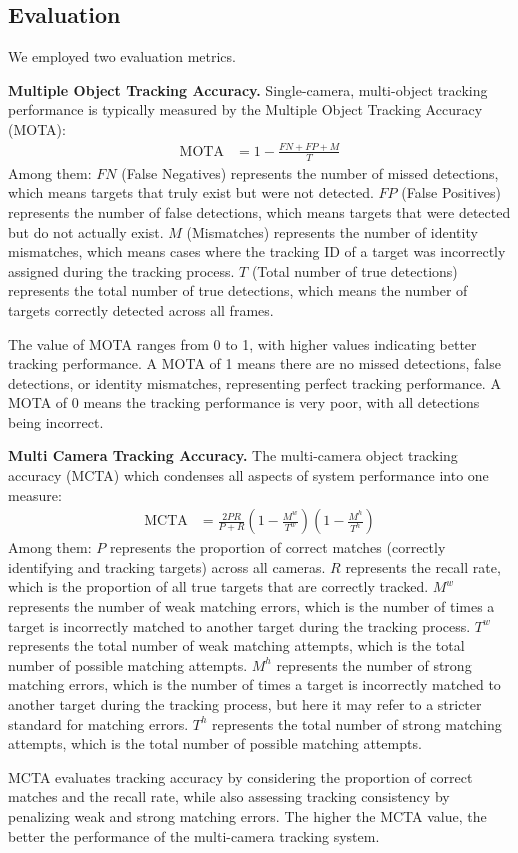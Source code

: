 \subsection{Evaluation}

We employed two evaluation metrics.

\textbf{Multiple Object Tracking Accuracy.}
Single-camera, multi-object tracking performance is typically measured by the Multiple Object Tracking Accuracy (MOTA):
\begin{align}
	\mathrm{MOTA} & = 1-\frac{F N+F P+M}{T}
\end{align}
Among them:
$FN$ (False Negatives) represents the number of missed detections, which means targets that truly exist but were not detected.
$FP$ (False Positives) represents the number of false detections, which means targets that were detected but do not actually exist.
$M$ (Mismatches) represents the number of identity mismatches, which means cases where the tracking ID of a target was incorrectly assigned during the tracking process.
$T$ (Total number of true detections) represents the total number of true detections, which means the number of targets correctly detected across all frames.

The value of MOTA ranges from 0 to 1, with higher values indicating better tracking performance. 
A MOTA of 1 means there are no missed detections, false detections, or identity mismatches, representing perfect tracking performance. 
A MOTA of 0 means the tracking performance is very poor, with all detections being incorrect.

\textbf{Multi Camera Tracking Accuracy.}
The multi-camera object tracking accuracy (MCTA) which condenses all aspects of system performance into one measure\cite{Alpher23b}:
\begin{align}
	\mathrm{MCTA} & = \frac{2 P R}{P+R}\left(1-\frac{M^{w}}{T^{w}}\right)\left(1-\frac{M^{h}}{T^{h}}\right)
\end{align}
Among them:
$P$ represents the proportion of correct matches (correctly identifying and tracking targets) across all cameras.  
$R$ represents the recall rate, which is the proportion of all true targets that are correctly tracked.  
$M^{w}$ represents the number of weak matching errors, which is the number of times a target is incorrectly matched to another target during the tracking process.  
$T^{w}$ represents the total number of weak matching attempts, which is the total number of possible matching attempts.  
$M^{h}$ represents the number of strong matching errors, which is the number of times a target is incorrectly matched to another target during the tracking process, but here it may refer to a stricter standard for matching errors.  
$T^{h}$ represents the total number of strong matching attempts, which is the total number of possible matching attempts.

MCTA evaluates tracking accuracy by considering the proportion of correct matches and the recall rate, while also assessing tracking consistency by penalizing weak and strong matching errors. 
The higher the MCTA value, the better the performance of the multi-camera tracking system.
